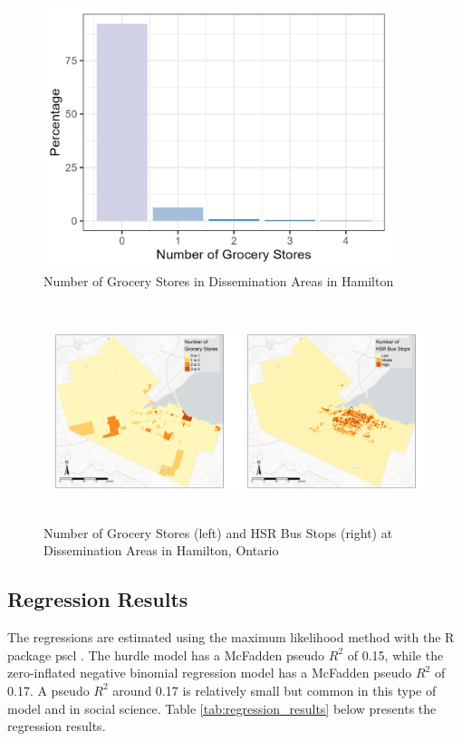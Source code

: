 \documentclass[preprint, 3p,
authoryear]{elsarticle} %
\begin{document}
\begin{figure}

{\centering \includegraphics[width=4in,height=3in]{./images/dep} 

}

\caption{\label{fig:dep}Number of Grocery Stores in Dissemination Areas in Hamilton}\label{fig:unnamed-chunk-9}
\end{figure}

\begin{figure}

{\centering \includegraphics[width=6in,height=2.5in]{./images/descriptive} 

}

\caption{\label{fig:descriptive}Number of Grocery Stores (left) and HSR Bus Stops (right) at Dissemination Areas in Hamilton, Ontario}\label{fig:unnamed-chunk-12}
\end{figure}

\subsection{Regression Results}\label{regression-results}

The regressions are estimated using the maximum likelihood method with
the R package pscl \citep{pscl}. The hurdle model has a McFadden pseudo
\(R^2\) of 0.15, while the zero-inflated negative binomial regression
model has a McFadden pseudo \(R^2\) of 0.17. A pseudo \(R^2\) around
0.17 is relatively small but common in this type of model and in social
science. Table \ref{tab:regression_results} below presents the
regression results.
\end{document}
